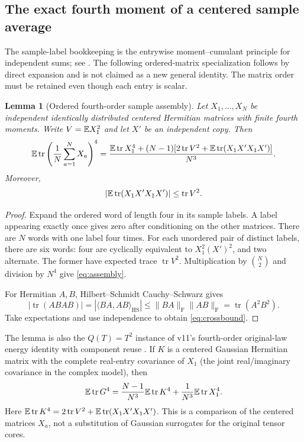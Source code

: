 \documentclass[11pt]{article}
\numberwithin{equation}{section}
\newtheorem{lemma}[theorem]{Lemma}
\theoremstyle{definition}\newtheorem{definition}[theorem]{Definition}
\theoremstyle{remark}\newtheorem{remark}[theorem]{Remark}
\newcommand{\tr}{\operatorname{tr}}\newcommand{\Ent}{\operatorname{Ent}}
\newcommand{\norm}[1]{\lVert#1\rVert}\newcommand{\ip}[2]{\langle#1,#2\rangle}
\begin{document}
\subsection{The exact fourth moment of a centered sample average}
The sample-label bookkeeping is the entrywise moment--cumulant principle for
independent sums; see \cite[Chapter~2]{McCullagh}. The following ordered-matrix
specialization follows by direct expansion and is not claimed as a new general
identity. The matrix order must be retained even though each entry is scalar.
\begin{lemma}[Ordered fourth-order sample assembly]\label{lem:assembly}
Let $X_1,\ldots,X_N$ be independent identically distributed centered Hermitian
matrices with finite fourth moments. Write $V=\mathbb E X_1^2$ and let $X'$ be an
independent copy. Then
\begin{equation}\label{eq:assembly}
 \E\tr\left(\frac1N\sum_{a=1}^N X_a\right)^4
 =\frac{\E\tr X_1^4+(N-1)
 [2\tr V^2+\E\tr(X_1X'X_1X')]}{N^3}.
\end{equation}
Moreover,
\begin{equation}\label{eq:crossbound}
 \left|\E\tr(X_1X'X_1X')\right|\le\tr V^2.
\end{equation}
\end{lemma}
\begin{proof}
Expand the ordered word of length four in its sample labels. A label appearing
exactly once gives zero after conditioning on the other matrices. There are
$N$ words with one label four times. For each unordered pair of distinct labels,
there are six words: four are cyclically equivalent to $X_1^2(X')^2$, and two
alternate. The former have expected trace $\tr V^2$. Multiplication by
$\binom N2$ and division by $N^4$ give \eqref{eq:assembly}.

For Hermitian $A,B$, Hilbert--Schmidt Cauchy--Schwarz gives
\[
 |\tr(ABAB)|=|\langle BA,AB\rangle_{\mathrm{HS}}|
 \le\norm{BA}_{\mathrm F}\norm{AB}_{\mathrm F}
 =\tr(A^2B^2).
\]
Take expectations and use independence to obtain \eqref{eq:crossbound}.
\end{proof}

The lemma is also the $Q(T)=T^2$ instance of v11's fourth-order original-law
energy identity with component reuse \cite{Framework}. If $K$ is a centered
Gaussian Hermitian matrix with the complete real-entry covariance of $X_1$
(the joint real/imaginary covariance in the complex model), then
\begin{equation}\label{eq:calibration}
 \E\tr G^4=\frac{N-1}{N^3}\E\tr K^4+\frac1{N^3}\E\tr X_1^4.
\end{equation}
Here $\E\tr K^4=2\tr V^2+\E\tr(X_1X'X_1X')$.
This is a comparison of the centered matrices $X_a$, not a substitution of
Gaussian surrogates for the original tensor cores.
\end{document}
